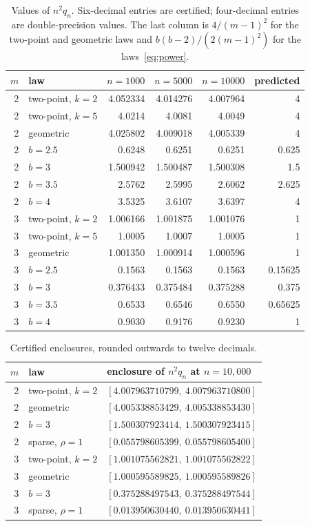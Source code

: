 \documentclass[11pt]{amsart}
\theoremstyle{remark}
\numberwithin{equation}{section}
\begin{document}
\begin{table}[tbp]
\centering
\begin{tabular}{rlrrrr}
\toprule
$m$ & law & $n=1000$ & $n=5000$ & $n=10000$ & predicted\\
\midrule
2 & two-point, $k=2$ & 4.052334 & 4.014276 & 4.007964 & 4\\
2 & two-point, $k=5$ & 4.0214 & 4.0081 & 4.0049 & 4\\
2 & geometric & 4.025802 & 4.009018 & 4.005339 & 4\\
2 & $b=2.5$ & 0.6248 & 0.6251 & 0.6251 & 0.625\\
2 & $b=3$ & 1.500942 & 1.500487 & 1.500308 & 1.5\\
2 & $b=3.5$ & 2.5762 & 2.5995 & 2.6062 & 2.625\\
2 & $b=4$ & 3.5325 & 3.6107 & 3.6397 & 4\\
3 & two-point, $k=2$ & 1.006166 & 1.001875 & 1.001076 & 1\\
3 & two-point, $k=5$ & 1.0005 & 1.0007 & 1.0005 & 1\\
3 & geometric & 1.001350 & 1.000914 & 1.000596 & 1\\
3 & $b=2.5$ & 0.1563 & 0.1563 & 0.1563 & 0.15625\\
3 & $b=3$ & 0.376433 & 0.375484 & 0.375288 & 0.375\\
3 & $b=3.5$ & 0.6533 & 0.6546 & 0.6550 & 0.65625\\
3 & $b=4$ & 0.9030 & 0.9176 & 0.9230 & 1\\
\bottomrule
\end{tabular}
\caption{Values of $n^2q_n$. Six-decimal entries are certified; four-decimal entries are double-precision values. The last column is $4/(m-1)^2$ for the two-point and geometric laws and $b(b-2)/(2(m-1)^2)$ for the laws~\eqref{eq:power}.}\label{tab:values}
\end{table}

\begin{table}[tbp]
\centering
\begin{tabular}{rll}
\toprule
$m$ & law & enclosure of $n^2q_n$ at $n=10{,}000$\\
\midrule
2 & two-point, $k=2$ & $[4.007963710799,\ 4.007963710800]$\\
2 & geometric & $[4.005338853429,\ 4.005338853430]$\\
2 & $b=3$ & $[1.500307923414,\ 1.500307923415]$\\
2 & sparse, $\rho=1$ & $[0.055798605399,\ 0.055798605400]$\\
3 & two-point, $k=2$ & $[1.001075562821,\ 1.001075562822]$\\
3 & geometric & $[1.000595589825,\ 1.000595589826]$\\
3 & $b=3$ & $[0.375288497543,\ 0.375288497544]$\\
3 & sparse, $\rho=1$ & $[0.013950630440,\ 0.013950630441]$\\
\bottomrule
\end{tabular}
\caption{Certified enclosures, rounded outwards to twelve decimals.}\label{tab:cert}
\end{table}
\end{document}
